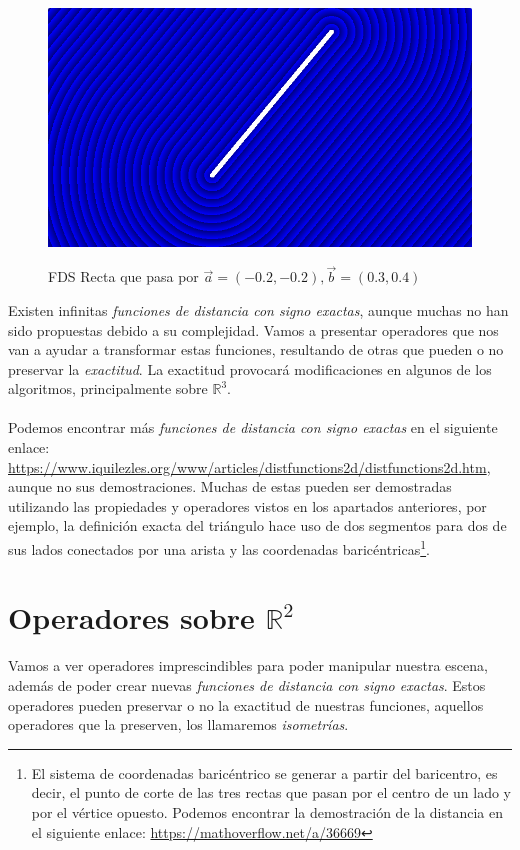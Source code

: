 \begin{figure}[H]
  \centering
  \captionsetup{justification=centering}%
  \includegraphics[width=1.0\textwidth]{secciones/imagenes/sdf/2d/sdf_segmento.png}\label{fig:segmento}
  \caption{FDS Recta que pasa por \(\Vec{a}=(-0.2, -0.2), \Vec{b}=(0.3, 0.4)\)}
\end{figure}

Existen infinitas \textit{funciones de distancia con signo exactas}, aunque muchas no han sido propuestas debido a su complejidad. Vamos a presentar operadores que nos van a ayudar a transformar estas funciones, resultando de otras que pueden o no preservar la \textit{exactitud}. La exactitud provocará modificaciones en algunos de los algoritmos, principalmente sobre \(\mathbb{R}^3\).\\\\
Podemos encontrar más \textit{funciones de distancia con signo exactas} en el siguiente enlace: \url{https://www.iquilezles.org/www/articles/distfunctions2d/distfunctions2d.htm}, aunque no sus demostraciones. Muchas de estas pueden ser demostradas utilizando las propiedades y operadores vistos en los apartados anteriores, por ejemplo, la definición exacta del triángulo hace uso de dos segmentos para dos de sus lados conectados por una arista y las coordenadas baricéntricas\footnote{El sistema de coordenadas baricéntrico se generar a partir del baricentro, es decir, el punto de corte de las tres rectas que pasan por el centro de un lado y por el vértice opuesto. Podemos encontrar la demostración de la distancia en el siguiente enlace: \url{https://mathoverflow.net/a/36669}}.

\section{Operadores sobre \(\mathbb{R}^2\)}
Vamos a ver operadores imprescindibles para poder manipular nuestra escena, además de poder crear nuevas \textit{funciones de distancia con signo exactas}. Estos operadores pueden preservar o no la exactitud de nuestras funciones, aquellos operadores que la preserven, los llamaremos \textit{isometrías}.

